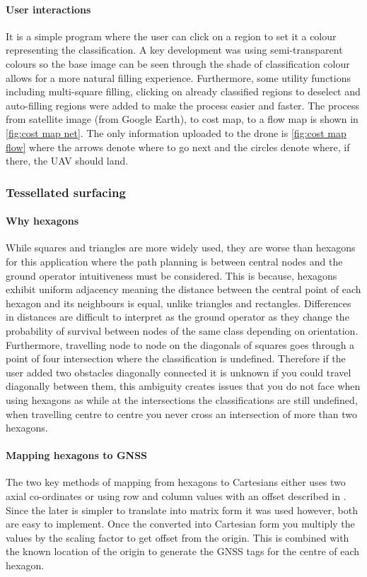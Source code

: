 \paragraph{User interactions}
It is a simple program where the user can click on a region to set it a colour representing the classification. A key development was using semi-transparent colours so the base image can be seen through the shade of classification colour allows for a more natural filling experience. Furthermore, some utility functions including multi-square filling, clicking on already classified regions to deselect and auto-filling regions were added to make the process easier and faster. The process from satellite image (from Google Earth), to cost map, to a flow map is shown in \ref{fig:cost map net}. The only information uploaded to the drone is \ref{fig:cost map flow} where the arrows denote where to go next and the circles denote where, if there, the \gls{UAV} should land.

\subsubsection{Tessellated surfacing}
\paragraph{Why hexagons} While squares and triangles are more widely used, they are worse than hexagons for this application where the path planning is between central nodes and the ground operator intuitiveness must be considered. This is because, hexagons exhibit uniform adjacency meaning the distance between the central point of each hexagon and its neighbours is equal, unlike triangles and rectangles. Differences in distances are difficult to interpret as the ground operator as they change the probability of survival between nodes of the same class depending on orientation. Furthermore, travelling node to node on the diagonals of squares goes through a point of four intersection where the classification is undefined. Therefore if the user added two obstacles diagonally connected it is unknown if you could travel diagonally between them, this ambiguity creates issues that you do not face when using hexagons as while at the intersections the classifications are still undefined, when travelling centre to centre you never cross an intersection of more than two hexagons.
\paragraph{Mapping hexagons to \gls{GNSS}} \label{para:Mapping hexagons}
The two key methods of mapping from hexagons to Cartesians either uses two axial co-ordinates or using row and column values with an offset described in \cite{MappingHexagons}. Since the later is simpler to translate into matrix form it was used however, both are easy to implement. Once the converted into Cartesian form you multiply the values by the scaling factor to get offset from the origin. This is combined with the known location of the origin to generate the \gls{GNSS} tags for the centre of each hexagon.

